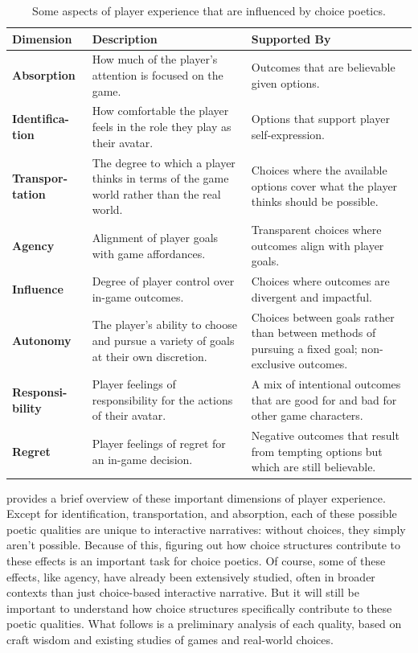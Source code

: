\begin{table}[!p]
\begingroup
\renewcommand*{\arraystretch}{1.5}
\begin{tabular}{p{5.5em}p{14em}p{13.5em}}
\toprule
\textbf{Dimension} & \textbf{Description} & \textbf{Supported By} \\
\midrule
\textbf{Absorption} & How much of the player's attention is focused on the game. & Outcomes that are believable given options. \\
\textbf{Identifica-tion} & How comfortable the player feels in the role they play as their avatar. & Options that support player self-expression. \\
\textbf{Transpor-tation} & The degree to which a player thinks in terms of the game world rather than the real world. & Choices where the available options cover what the player thinks should be possible. \\
\textbf{Agency} & Alignment of player goals with game affordances. & Transparent choices where outcomes align with player goals.\\
\textbf{Influence} & Degree of player control over in-game outcomes. & Choices where outcomes are divergent and impactful. \\
\textbf{Autonomy} & The player's ability to choose and pursue a variety of goals at their own discretion. & Choices between goals rather than between methods of pursuing a fixed goal; non-exclusive outcomes. \\
\textbf{Responsi-bility} & Player feelings of responsibility for the actions of their avatar. & A mix of intentional outcomes that are good for and bad for other game characters. \\
\textbf{Regret} & Player feelings of regret for an in-game decision. & Negative outcomes that result from tempting options but which are still believable. \\
\bottomrule
\end{tabular}
\endgroup
\caption[Dimensions of player experience]{Some aspects of player experience that are influenced by choice poetics.}
\label{tab:dimensions-of-experience}
\end{table}

 provides a brief overview of these important dimensions of player experience.
%
Except for identification, transportation, and absorption, each of these possible poetic qualities are unique to interactive narratives: without choices, they simply aren't possible.
%
Because of this, figuring out how choice structures contribute to these effects 
is an important task for choice poetics.
%
Of course, some of these effects, like agency, have already been extensively studied, often in broader contexts than just choice-based interactive narrative.
%
But it will still be important to understand how choice structures specifically contribute to these poetic qualities.
%
What follows is a preliminary analysis of each quality, based on craft wisdom and existing studies of games and real-world choices.

